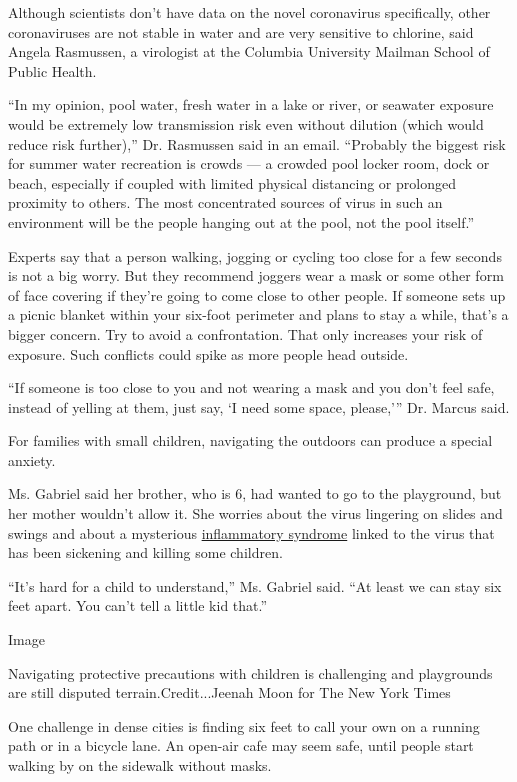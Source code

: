 Although scientists don't have data on the novel coronavirus
specifically, other coronaviruses are not stable in water and are very
sensitive to chlorine, said Angela Rasmussen, a virologist at the
Columbia University Mailman School of Public Health.

``In my opinion, pool water, fresh water in a lake or river, or seawater
exposure would be extremely low transmission risk even without dilution
(which would reduce risk further),'' Dr. Rasmussen said in an email.
``Probably the biggest risk for summer water recreation is crowds --- a
crowded pool locker room, dock or beach, especially if coupled with
limited physical distancing or prolonged proximity to others. The most
concentrated sources of virus in such an environment will be the people
hanging out at the pool, not the pool itself.''

Experts say that a person walking, jogging or cycling too close for a
few seconds is not a big worry. But they recommend joggers wear a mask
or some other form of face covering if they're going to come close to
other people. If someone sets up a picnic blanket within your six-foot
perimeter and plans to stay a while, that's a bigger concern. Try to
avoid a confrontation. That only increases your risk of exposure. Such
conflicts could spike as more people head outside.

``If someone is too close to you and not wearing a mask and you don't
feel safe, instead of yelling at them, just say, `I need some space,
please,''' Dr. Marcus said.

For families with small children, navigating the outdoors can produce a
special anxiety.

Ms. Gabriel said her brother, who is 6, had wanted to go to the
playground, but her mother wouldn't allow it. She worries about the
virus lingering on slides and swings and about a mysterious
\href{https://www.nytimes3xbfgragh.onion/2020/05/13/health/coronavirus-children-kawasaki-pmis.html}{inflammatory
syndrome} linked to the virus that has been sickening and killing some
children.

``It's hard for a child to understand,'' Ms. Gabriel said. ``At least we
can stay six feet apart. You can't tell a little kid that.''

Image

Navigating protective precautions with children is challenging and
playgrounds are still disputed terrain.Credit...Jeenah Moon for The New
York Times

One challenge in dense cities is finding six feet to call your own on a
running path or in a bicycle lane. An open-air cafe may seem safe, until
people start walking by on the sidewalk without masks.

